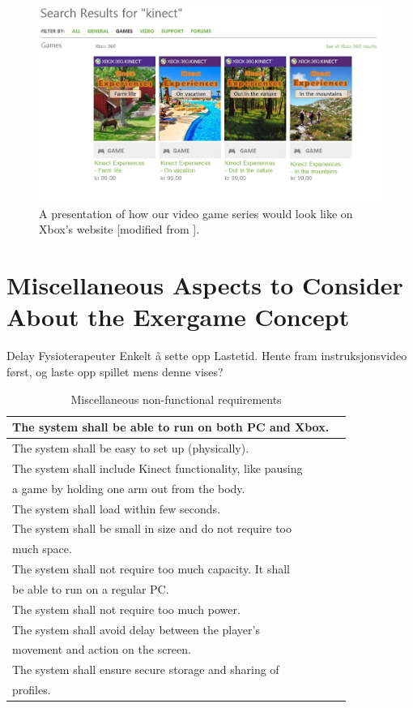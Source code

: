 \begin{figure} [H]
\centering
\includegraphics[scale=0.5, angle=90]{videoGameSeries.jpg}
\caption[Presentation of our video game series in a Xbox website view]{A presentation of how our video game series would look like on Xbox's website [modified from \cite{XboxNettside}].}
\label{fig:videogameseriesHele}
\end{figure}



\section{Miscellaneous Aspects to Consider About the Exergame Concept}
\label{sec:misc}

Delay
Fysioterapeuter
Enkelt å sette opp
Lastetid. Hente fram instruksjonsvideo først, og laste opp spillet mens denne vises?

\begin{table} [H]
\label{tab:nfunc2}
\centering
    \begin{tabular}{|l|l|}
 
       \hline
The system shall be able to run on both PC and Xbox. \\ \hline
The system shall be easy to set up (physically).\\ \hline
The system shall include Kinect functionality, like pausing \\ a game by holding one arm out from the body. \\ \hline
The system shall load within few seconds.\\ \hline
The system shall be small in size and do not require too \\ much space.\\ \hline
The system shall not require too much capacity. It shall \\ be able to run on a regular PC. \\ \hline
The system shall not require too much power. \\ \hline
The system shall avoid delay between the player's \\ movement and action on the screen.\\ \hline
The system shall ensure secure storage and sharing of \\ profiles. \\ \hline
    \end{tabular}
    \caption[Miscellaneous non-functional requirements]{Miscellaneous non-functional requirements}
\end{table} 
